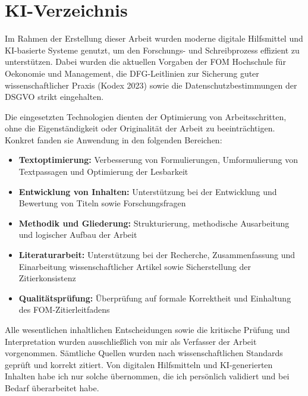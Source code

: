 \documentclass[12pt,oneside,titlepage,listof=totoc,bibliography=totoc]{scrartcl}
\begin{document}
\newpage

\printbibliography[type=online,heading=subbibliography,title={\headingNameInternetSources}]

\newpage
\section*{KI-Verzeichnis}

Im Rahmen der Erstellung dieser Arbeit wurden moderne digitale Hilfsmittel und KI-basierte Systeme genutzt, um den Forschungs- und Schreibprozess effizient zu unterstützen. Dabei wurden die aktuellen Vorgaben der FOM Hochschule f\"ur Oekonomie und Management, die DFG-Leitlinien zur Sicherung guter wissenschaftlicher Praxis (Kodex 2023) sowie die Datenschutzbestimmungen der DSGVO strikt eingehalten.

Die eingesetzten Technologien dienten der Optimierung von Arbeitsschritten, ohne die Eigenst\"andigkeit oder Originalit\"at der Arbeit zu beeintr\"achtigen. Konkret fanden sie Anwendung in den folgenden Bereichen:

\begin{itemize}
  \item \textbf{Textoptimierung:} Verbesserung von Formulierungen, Umformulierung von Textpassagen und Optimierung der Lesbarkeit
  \item \textbf{Entwicklung von Inhalten:} Unterst\"utzung bei der Entwicklung und Bewertung von Titeln sowie Forschungsfragen
  \item \textbf{Methodik und Gliederung:} Strukturierung, methodische Ausarbeitung und logischer Aufbau der Arbeit
  \item \textbf{Literaturarbeit:} Unterst\"utzung bei der Recherche, Zusammenfassung und Einarbeitung wissenschaftlicher Artikel sowie Sicherstellung der Zitierkonsistenz
  \item \textbf{Qualit\"atspr\"ufung:} \"Uberpr\"ufung auf formale Korrektheit und Einhaltung des FOM-Zitierleitfadens
\end{itemize}

Alle wesentlichen inhaltlichen Entscheidungen sowie die kritische Pr\"ufung und Interpretation wurden ausschlie\ss{}lich von mir als Verfasser der Arbeit vorgenommen. S\"amtliche Quellen wurden nach wissenschaftlichen Standards gepr\"uft und korrekt zitiert. Von digitalen Hilfsmitteln und KI-generierten Inhalten habe ich nur solche \"ubernommen, die ich pers\"onlich validiert und bei Bedarf \"uberarbeitet habe.
\end{document}
